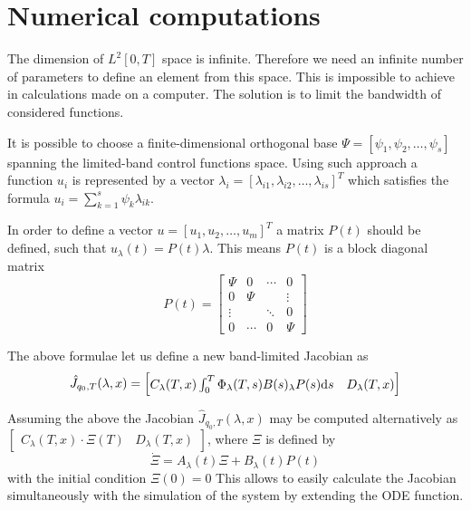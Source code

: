 \section{Numerical computations}
The dimension of $L^2[0,T]$ space is infinite. Therefore we need an infinite number of parameters to define an element from this space. This is impossible to achieve in calculations made on a computer. The solution is to limit the bandwidth of considered functions. 

It is possible to choose a finite-dimensional orthogonal base $\Psi = [ \psi_1, \psi_2, \dots, \psi_s ]$ spanning the limited-band control functions space. 
Using such approach a function $u_i$ is represented by a vector 
$\lambda_i = [\lambda_{i1}, \lambda_{i2}, \dots, \lambda_{is}]^T$ 
which satisfies the formula $u_i = \sum_{k=1}^s \psi_k \lambda_{ik}$.

In order to define a vector $u=[u_1, u_2, \dots, u_m]^T$ a matrix $P(t)$ should be defined, such that $u_\lambda(t)=P(t)\lambda$. This means $P(t)$ is a block diagonal matrix 
\begin{equation}
P(t)=\begin{bmatrix}
\Psi & 0 & \cdots & 0\\
0 & \Psi &  & \vdots\\
\vdots &  & \ddots & 0 \\
0 &  \cdots & 0 & \Psi
\end{bmatrix}
\end{equation}

The above formulae let us define a new band-limited Jacobian as \cite{ecs_ijc}
\begin{equation}
\hat J_{q_0, T}(\lambda, x)=\begin{bmatrix}C_\lambda(T,x)\int_0^T \Phi_\lambda(T,s)B(s)_\lambda P(s)\mathrm{d} s & D_\lambda(T,x)\end{bmatrix}
\end{equation}

Assuming the above the Jacobian $\hat J_{q_0, T}(\lambda, x)$
may be computed alternatively as\\ $\begin{bmatrix}
C_\lambda(T,x)\cdot\Xi(T)& D_\lambda(T,x)
\end{bmatrix}$, where $\Xi$ is defined by  
\begin{equation}
\dot \Xi = A_\lambda(t)\Xi +B_\lambda(t)P(t)
\end{equation}
with the initial condition $\Xi(0)=0$ %
This allows to easily calculate the Jacobian simultaneously with the simulation
of the system by extending the ODE function.

